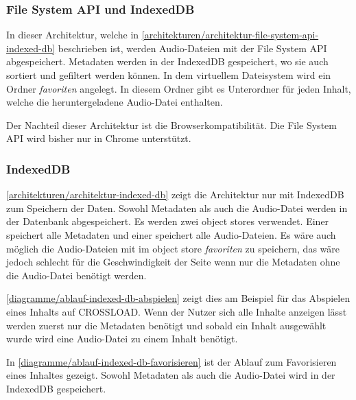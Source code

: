 \subsubsection{File System API und IndexedDB}

In dieser Architektur, welche in \autoref{architekturen/architektur-file-system-api-indexed-db} beschrieben ist, werden Audio-Dateien mit der File System \ac{API} abgespeichert. Metadaten werden in der IndexedDB gespeichert, wo sie auch sortiert und gefiltert werden können. In dem virtuellem Dateisystem wird ein Ordner \textit{favoriten} angelegt. In diesem Ordner gibt es Unterordner für jeden Inhalt, welche die heruntergeladene Audio-Datei enthalten. 

Der Nachteil dieser Architektur ist die Browserkompatibilität. Die File System \ac{API} wird bisher nur in Chrome unterstützt.

\subsubsection{IndexedDB}

\autoref{architekturen/architektur-indexed-db} zeigt die Architektur nur mit IndexedDB zum Speichern der Daten. Sowohl Metadaten als auch die Audio-Datei werden in der Datenbank abgespeichert. Es werden zwei object stores verwendet. Einer speichert alle Metadaten und einer speichert alle Audio-Dateien. Es wäre auch möglich die Audio-Dateien mit im object store \textit{favoriten} zu speichern, das wäre jedoch schlecht für die Geschwindigkeit der Seite wenn nur die Metadaten ohne die Audio-Datei benötigt werden.

\autoref{diagramme/ablauf-indexed-db-abspielen} zeigt dies am Beispiel für das Abspielen eines Inhalts auf CROSSLOAD. Wenn der Nutzer sich alle Inhalte anzeigen lässt werden zuerst nur die Metadaten benötigt und sobald ein Inhalt ausgewählt wurde wird eine Audio-Datei zu einem Inhalt benötigt. 


In \autoref{diagramme/ablauf-indexed-db-favorisieren} ist der Ablauf zum Favorisieren eines Inhaltes gezeigt. Sowohl Metadaten als auch die Audio-Datei wird in der IndexedDB gespeichert.


